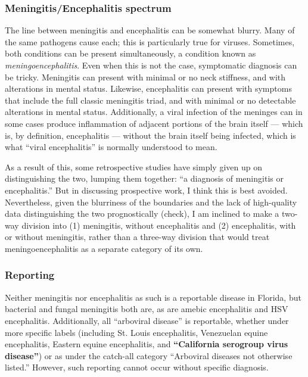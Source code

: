 \documentclass[12pt]{article}
\begin{document}
        \subsubsection{Meningitis/Encephalitis spectrum}
            The line between meningitis and encephalitis can be somewhat blurry. Many of the same pathogens cause each; this is particularly true for viruses. Sometimes, both conditions can be present simultaneously, a condition known as \textit{meningoencephalitis}. Even when this is not the case, symptomatic diagnosis can be tricky. Meningitis can present with minimal or no neck stiffness, and with alterations in mental status. Likewise, encephalitis can present with symptoms that include the full classic meningitis triad, and with minimal or no detectable alterations in mental status. Additionally, a viral infection of the meninges can in some cases produce inflammation of adjacent portions of the brain itself --- which is, by definition, encephalitis --- without the brain itself being infected, which is what ``viral encephalitis'' is normally understood to mean.

            As a result of this, some retrospective studies have simply given up on distinguishing the two, lumping them together: ``a diagnosis of meningitis or encephalitis.'' But in discussing prospective work, I think this is best avoided. Nevertheless, given the blurriness of the boundaries and the lack of high-quality data distinguishing the two prognostically (check), I am inclined to make a two-way division into (1) meningitis, without encephalitis and (2) encephalitis, with or without meningitis, rather than a three-way division that would treat meningoencephalitis as a separate category of its own.
        
        \subsubsection{Reporting}
            Neither meningitis nor encephalitis as such is a reportable disease in Florida, but bacterial and fungal meningitis both are, as are amebic encephalitis and HSV encephalitis. Additionally, all ``arboviral disease'' is reportable, whether under more specific labels (including St. Louis encephalitis, Venezuelan equine encephalitis, Eastern equine encephalitis, and \textbf{``California serogroup virus disease''}) or as under the catch-all category ``Arboviral diseases not otherwise listed.'' However, such reporting cannot occur without specific diagnosis.
\end{document}
